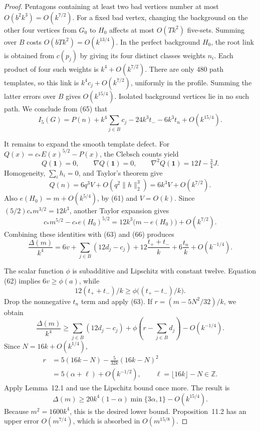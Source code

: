 \documentclass[11pt]{amsart}
\theoremstyle{definition}
\theoremstyle{remark}
\begin{document}
\begin{proof}
Pentagons containing at least two bad vertices number at most
$O(b^2k^3)=O(k^{7/2})$. For a fixed bad vertex, changing the background
on the other four vertices from $G_0$ to $H_0$ affects at most
$O(Tk^2)$ five-sets. Summing over $B$ costs $O(bTk^2)=O(k^{13/4})$.
In the perfect background $H_0$, the root link is obtained from $c(p_j)$
by giving its four distinct classes weights $n_i$. Each product of four
such weights is $k^4+O(k^{7/2})$. There are only $480$ path templates, so
this link is $k^4c_j+O(k^{7/2})$, uniformly in the profile. Summing the
latter errors over $B$ gives $O(k^{15/4})$. Isolated background vertices
lie in no such path. We conclude from (65) that
\begin{equation}\tag{66}\label{eq:phase-pentagon-count}
 I_5(G)=P(n)+k^4\sum_{j\in B}c_j-24k^3t_--6k^3t_n+O(k^{15/4}).
\end{equation}

It remains to expand the smooth template defect. For
$Q(x)=c_\ast E(x)^{5/2}-P(x)$, the Clebsch counts yield
\[
 Q(\mathbf1)=0,\qquad\nabla Q(\mathbf1)=0,\qquad
 \nabla^2Q(\mathbf1)=12I-\tfrac34J.
\]
Homogeneity, $\sum_i h_i=0$, and Taylor's theorem give
\[
 Q(n)=6q^3V+O(q^2\lVert h\rVert_2^3)=6k^3V+O(k^{7/2}).
\]
Also $e(H_0)=m+O(k^{5/4})$, by (61) and $V=O(k)$. Since
$(5/2)c_\ast m^{3/2}=12k^3$, another Taylor expansion gives
\[
 c_\ast m^{5/2}-c_\ast e(H_0)^{5/2}
   =12k^3\bigl(m-e(H_0)\bigr)+O(k^{7/2}).
\]
Combining these identities with (63) and (66) produces
\begin{equation}\tag{67}\label{eq:phase-deficit}
 \frac{\Delta(m)}{k^4}
 =6v+\sum_{j\in B}(12d_j-c_j)
    +12\frac{t_++t_-}{k}+6\frac{t_n}{k}+O(k^{-1/4}).
\end{equation}

The scalar function $\phi$ is subadditive and Lipschitz with constant
twelve. Equation (62) implies $6v\geq\phi(a)$, while
\[
 12(t_++t_-)/k\geq\phi\bigl((t_+-t_-)/k\bigr).
\]
Drop the nonnegative $t_n$ term and apply (63). If
$r=(m-5N^2/32)/k$, we obtain
\[
 \frac{\Delta(m)}{k^4}
 \geq\sum_{j\in B}(12d_j-c_j)
    +\phi\left(r-\sum_{j\in B}d_j\right)-O(k^{-1/4}).
\]
Since $N=16k+O(k^{1/4})$,
\begin{align*}
 r&=5(16k-N)-\frac{5}{32k}(16k-N)^2\\
  &=5(\alpha+\ell)+O(k^{-1/2}),\qquad
       \ell=\lfloor16k\rfloor-N\in\mathbb Z.
\end{align*}
Apply Lemma~12.1 and use the Lipschitz bound once more. The result is
\[
 \Delta(m)\geq20k^4(1-\alpha)\min\{3\alpha,1\}-O(k^{15/4}).
\]
Because $m^2=1600k^4$, this is the desired lower bound.
Proposition~11.2 has an upper error $O(m^{7/4})$, which is absorbed in
$O(m^{15/8})$.
\end{proof}
\end{document}
